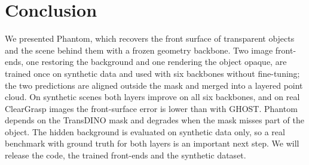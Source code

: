 \section{Conclusion}
\label{sec:conclusion}

We presented Phantom, which recovers the front surface of transparent objects and the scene behind them with a frozen geometry backbone.
Two image front-ends, one restoring the background and one rendering the object opaque, are trained once on synthetic data and used with six backbones without fine-tuning; the two predictions are aligned outside the mask and merged into a layered point cloud.
On synthetic scenes both layers improve on all six backbones, and on real ClearGrasp images the front-surface error is lower than with GHOST.
Phantom depends on the TransDINO mask and degrades when the mask misses part of the object.
The hidden background is evaluated on synthetic data only, so a real benchmark with ground truth for both layers is an important next step.
We will release the code, the trained front-ends and the synthetic dataset.
